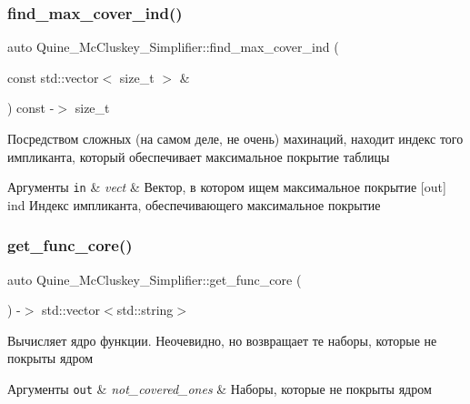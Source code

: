 \subsubsection{\texorpdfstring{find\+\_\+max\+\_\+cover\+\_\+ind()}{find\_max\_cover\_ind()}}
{\footnotesize\ttfamily auto Quine\+\_\+\+Mc\+Cluskey\+\_\+\+Simplifier\+::find\+\_\+max\+\_\+cover\+\_\+ind (\begin{DoxyParamCaption}\item[{const std\+::vector$<$ size\+\_\+t $>$ \&}]{ }\end{DoxyParamCaption}) const -\/$>$ size\+\_\+t\hspace{0.3cm}{\ttfamily [private]}}

Посредством сложных (на самом деле, не очень) махинаций, находит индекс того импликанта, который обеспечивает максимальное покрытие таблицы 
\begin{DoxyParams}[1]{Аргументы}
\mbox{\tt in}  & {\em vect} & Вектор, в котором ищем максимальное покрытие \mbox{[}out\mbox{]} ind Индекс импликанта, обеспечивающего максимальное покрытие \\
\hline
\end{DoxyParams}
\mbox{\label{class_quine___mc_cluskey___simplifier_a5e6b546c90636c4125031981900b55e3}} 
\subsubsection{\texorpdfstring{get\+\_\+func\+\_\+core()}{get\_func\_core()}}
{\footnotesize\ttfamily auto Quine\+\_\+\+Mc\+Cluskey\+\_\+\+Simplifier\+::get\+\_\+func\+\_\+core (\begin{DoxyParamCaption}{ }\end{DoxyParamCaption}) -\/$>$ std\+::vector$<$std\+::string$>$\hspace{0.3cm}{\ttfamily [private]}}

Вычисляет ядро функции. Неочевидно, но возвращает те наборы, которые не покрыты ядром 
\begin{DoxyParams}[1]{Аргументы}
\mbox{\tt out}  & {\em not\+\_\+covered\+\_\+ones} & Наборы, которые не покрыты ядром \\
\hline
\end{DoxyParams}
\mbox{\label{class_quine___mc_cluskey___simplifier_aa94d0249575bd1364924b6fe0126ac43}} 
